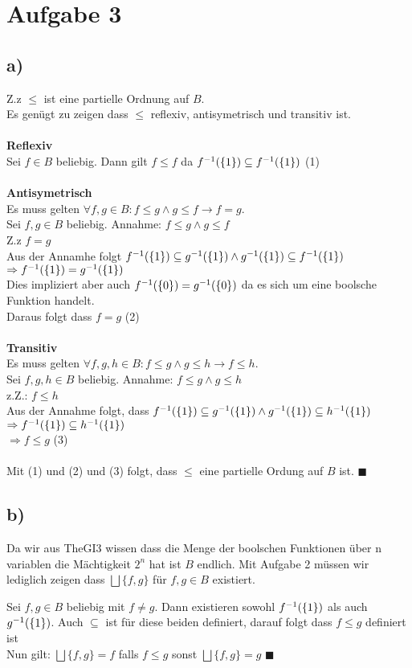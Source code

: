 \section*{Aufgabe 3}
\subsection*{a)}

Z.z $\leq$ ist eine partielle Ordnung auf $B$.\\
Es genügt zu zeigen dass $\leq$ reflexiv, antisymetrisch und transitiv ist.\\\\
\textbf{Reflexiv\\}
Sei $f \in B$ beliebig. Dann gilt $f \leq f$ da $f^{-1}(\{1\}) \subseteq f^{-1}(\{1\})$ (1)\\\\
\textbf{Antisymetrisch \\}
Es muss gelten $\forall f,g \in B : f \leq g \land g \leq f \rightarrow f =g$.\\
Sei $f,g \in B$ beliebig. 
Annahme: $f \leq g \land g \leq f $ \\
Z.z $f =g$\\
Aus der Annamhe folgt $f^{-1}(\{1\}) \subseteq g^{-1}(\{1\}) \land g^{-1}(\{1\}) \subseteq f^{-1}(\{1\}) $\\
 $\Rightarrow f^{-1}(\{1\}) = g^{-1}(\{1\})$\\
Dies impliziert aber auch $f^{-1}(\{0\}) = g^{-1}(\{0\})$ da es sich um eine boolsche Funktion handelt.\\
Daraus folgt dass $f=g$ (2)\\\\
\textbf{Transitiv\\}
Es muss gelten $\forall f,g,h \in B : f \leq g \land g \leq h \rightarrow f \leq h$.\\
Sei $f,g,h \in B$ beliebig. 
Annahme: $f \leq g \land g \leq h$\\
z.Z.: $f \leq h$\\
Aus der Annahme folgt, dass  $f^{-1}(\{1\}) \subseteq g^{-1}(\{1\}) \land g^{-1}(\{1\}) \subseteq h^{-1}(\{1\})$\\
$\Rightarrow f^{-1}(\{1\}) \subseteq h^{-1}(\{1\})$\\
$\Rightarrow f \leq g$ (3)\\\\
Mit (1) und (2) und (3) folgt, dass $\leq$ eine partielle Ordung auf $B$ ist. $\blacksquare$

\subsection*{b)}
Da wir aus TheGI3 wissen dass die Menge der boolschen Funktionen über n variablen die Mächtigkeit $2^n$ hat ist $B$ endlich.
Mit Aufgabe 2 müssen wir lediglich zeigen dass $ \bigsqcup \{f,g\}$ für $f,g \in B$ existiert.

Sei $f,g \in B$ beliebig mit $f \neq g$. 
Dann existieren sowohl $f^{-1}(\{1\})$ als auch $g^{-1}(\{1\})$. Auch $\subseteq$ ist für diese beiden definiert, darauf folgt dass $f \leq g$ definiert ist\\
Nun gilt:
$ \bigsqcup \{f,g\}= f$ falls $f \leq g$ sonst 
$ \bigsqcup \{f,g\}= g$ $\blacksquare$


